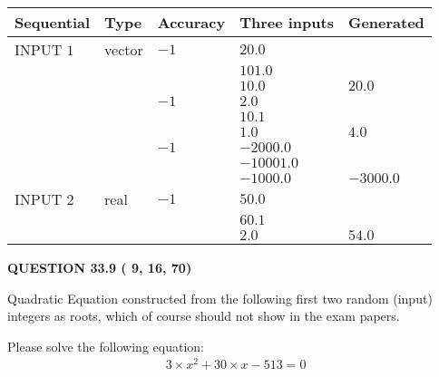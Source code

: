 \documentclass[12pt]{article}
\begin{document}
  
\noindent\begin{tabular}{|l|l|l|l|l|}
\hline
 Sequential & Type & Accuracy & Three inputs & Generated \\ 
\hline
 
 
  INPUT $           1$ & vector & $          -1 $ & $
20.0
  $ & \\
  & & & $
101.0
  $ & \\
  & & & $
10.0
$ & $ 20.0 $ 
  \\
  & & $          -1 $ & $
2.0
  $ & \\
  & & & $
10.1
  $ & \\
  & & & $
1.0
$ & $ 4.0 $ 
  \\
  & & $          -1 $ & $
-2000.0
  $ & \\
  & & & $
-10001.0
  $ & \\
  & & & $
-1000.0
$ & $ -3000.0 $ 
 \\  \hline  
 
 
  INPUT $           2$ & real & $          -1 $ & $
 50.0
  $ & \\
  & & &  $
 60.1
  $ & \\
  & & &  $
 2.0
 $ & $ 54.0 $ 
 \\  \hline  
 \end{tabular}
   
   
  
\vspace{0.2in}
  
{\textbf{\Large{QUESTION
33.9 
 (          9,         16,         70)
}}}
  
  


\noindent{}
Quadratic Equation constructed from the following first two random (input) integers as roots,  
which of course should not show in the exam papers.  
\noindent{}


 
 

 
Please solve the following equation:
\begin{eqnarray*}
3 \times x^2  %
+  %
30
                 \times x    %
-513 =0
\end{eqnarray*}
 
 
 
\noindent{}
 
 
\end{document}
